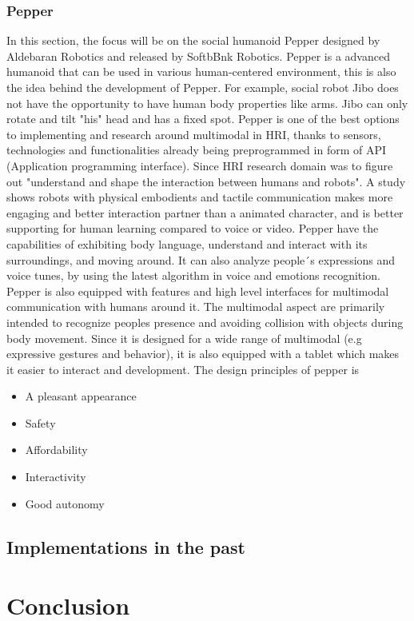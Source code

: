 \subsubsection{Pepper}
 In this section, the focus will be on the social humanoid Pepper designed by Aldebaran Robotics and released by SoftbBnk Robotics. Pepper is a advanced humanoid that can be used in various human-centered environment, this is also the idea behind the development of Pepper. For example, social robot Jibo does not have the opportunity to have human body properties like arms. Jibo can only rotate and tilt "his" head and has a fixed spot.
Pepper is one of the best options to implementing and research around multimodal in HRI, thanks to sensors, technologies and functionalities already being  preprogrammed in form of API (Application programming interface). Since HRI research domain was to figure out "understand and shape the interaction between humans and robots". A study shows  robots with physical embodients and tactile communication makes more engaging and  better interaction partner than a animated character, and is better supporting for human learning compared to voice or video. 
Pepper have the capabilities of exhibiting body language, understand and interact with its surroundings, and moving around. It can also analyze people´s expressions and voice tunes, by using the latest algorithm in voice and emotions recognition. Pepper is also equipped with features and high level interfaces for multimodal communication with humans around it. The multimodal aspect are primarily intended to recognize peoples presence and avoiding collision with objects during body movement. Since it is designed for a wide range of multimodal (e.g expressive gestures and behavior), it is also equipped with a tablet which makes it easier to interact and development. The design principles of pepper is 
\begin{itemize}
    \item A pleasant appearance
    \item Safety    
    \item Affordability
    \item Interactivity
    \item Good autonomy
\end{itemize}


\subsection{Implementations in the past}

\subsection{}

\section{Conclusion}
